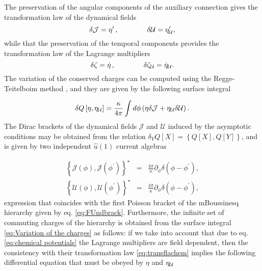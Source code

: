 \documentclass[letterpaper,11pt,oneside]{book}
\begin{document}
The preservation of the angular components of the auxiliary connection
gives the transformation law of the dynamical fields
\begin{equation}
	\delta\mathcal{J}=\eta^{\prime}\,,\qquad\qquad\delta{\cal U}=\eta_{{\cal U}}^{\prime},\label{eq:tarnsflawfields}
\end{equation}
while that the preservation of the temporal components provides the
transformation law of the Lagrange multipliers
\begin{equation}
	\delta\zeta=\dot{\eta}\,,\qquad\qquad\delta\mathcal{\zeta}_{{\cal U}}=\dot{\eta}_{{\cal U}}.\label{eq:transflachem}
\end{equation}
The variation of the conserved charges can be computed using the Regge-Teitelboim
method \cite{Regge:1974zd}, and they are given by the following surface
integral

\begin{equation}
	\delta Q\left[\eta,\eta_{{\cal U}}\right]=\frac{\kappa}{4\pi}\int d\phi\left(\eta\delta\mathcal{J}+\eta_{{\cal U}}\delta{\cal U}\right).\label{eq:Variation of the charges}
\end{equation}
The Dirac brackets of the dynamical fields $\mathcal{J}$ and $\mathcal{U}$
induced by the asymptotic conditions may be obtained from the relation
$\delta_{Y}Q\left[X\right]=\left\{ Q\left[X\right],Q\left[Y\right]\right\} $,
and is given by two independent $\hat{u}\left(1\right)$ current algebras

\begin{eqnarray}
	\left\{ \mathcal{J}\left(\phi\right),\mathcal{J}\left(\phi^{\prime}\right)\right\} ^{\star} & = & \frac{4\pi}{\kappa}\partial_{\phi}\delta\left(\phi-\phi^{\prime}\right),\nonumber \\
	\left\{ \mathcal{U}\left(\phi\right),\mathcal{U}\left(\phi^{\prime}\right)\right\} ^{\star} & = & \frac{4\pi}{\kappa}\partial_{\phi}\delta\left(\phi-\phi^{\prime}\right),\label{eq:Dirac}
\end{eqnarray}
expression that coincides with the first Poisson bracket of the mBoussinesq
hierarchy given by eq. \eqref{eq:FUndbrack}. Furthermore, the infinite
set of commuting charges of the hierarchy is obtained from the surface
integral \eqref{eq:Variation of the charges} as follows: if we take
into account that due to eq. \eqref{eq:chemical potentials} the Lagrange
multipliers are field dependent, then the consistency with their transformation
law \eqref{eq:transflachem} implies the following differential equation
that must be obeyed by $\eta$ and $\eta_{{\cal U}}$
\end{document}
